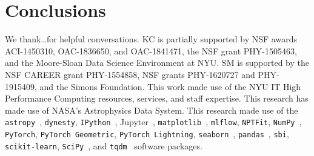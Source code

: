 \documentclass[prd,aps,10pt,nofootinbib,twocolumn,superscriptaddress,preprintnumbers,balancelastpage,longbibliography]{revtex4-1}
\begin{document}
\section{Conclusions}
\label{sec:conclusion}

\vspace{.3cm}

\begin{acknowledgments}

We thank\ldots for helpful conversations.  
KC is partially supported by NSF awards ACI-1450310, OAC-1836650, and OAC-1841471, the NSF grant PHY-1505463, and the Moore-Sloan Data Science Environment at NYU. 
SM is supported by the NSF CAREER grant PHY-1554858, NSF grants PHY-1620727 and PHY-1915409, and the Simons Foundation. 
This work made use of the NYU IT High Performance Computing resources, services, and staff expertise. 
This research has made use of NASA's Astrophysics Data System. 
This research made use of the \texttt{astropy}~\cite{Price-Whelan:2018hus,Robitaille:2013mpa}, \texttt{dynesty}, \texttt{IPython}~\cite{PER-GRA:2007}, Jupyter~\cite{Kluyver2016JupyterN}, \texttt{matplotlib}~\cite{Hunter:2007}, \texttt{mlflow}, \texttt{NPTFit}, \texttt{NumPy}~\cite{numpy:2011}, \texttt{PyTorch}, \texttt{PyTorch Geometric}, \texttt{PyTorch Lightning}, \texttt{seaborn}~\cite{seaborn}, \texttt{pandas}~\cite{pandas:2010}, \texttt{sbi}, \texttt{scikit-learn}, \texttt{SciPy}~\cite{2020SciPy-NMeth}, and \texttt{tqdm}~\cite{da2019tqdm}  software packages. 
\end{acknowledgments}





\end{document}
